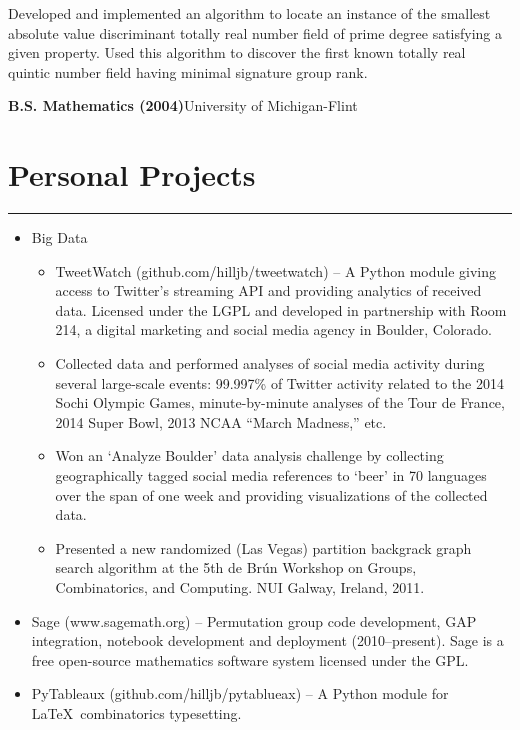 \documentclass[letterpaper,10pt]{article}
\newcommand{\mblue}{\color{darkblue}}
\begin{document}
Developed and implemented an algorithm to locate an instance of the smallest absolute value
discriminant totally real number field of prime degree satisfying a given property. Used this
algorithm to discover the first known totally real quintic number field having minimal signature
group rank.

\bigbreak \textbf{B.S. Mathematics (2004)}\hfill University of Michigan-Flint


\section*{\mblue Personal Projects}

\vspace{-2.15pc}
{\hfill\mblue\rule{5.21in}{0.02cm}}

\vspace{1pc}
\begin{itemize}
\item Big Data

\begin{itemize}
\item TweetWatch (github.com/hilljb/tweetwatch) -- A Python module giving access to Twitter's
streaming API and providing analytics of received data. Licensed under the LGPL and developed in
partnership with Room 214, a digital marketing and social media agency in Boulder, Colorado.

\item Collected data and performed analyses of social media activity during several large-scale
events: 99.997\% of Twitter activity related to the 2014 Sochi Olympic Games, minute-by-minute
analyses of the Tour de France, 2014 Super Bowl, 2013 NCAA ``March Madness,'' etc.

\item Won an `Analyze Boulder' data analysis challenge by collecting geographically tagged
social media references to `beer' in 70 languages over the span of one week and providing
visualizations of the collected data.

\item Presented a new randomized (Las Vegas) partition backgrack graph search algorithm at the 5th de
Br\'un Workshop on Groups, Combinatorics, and Computing. NUI Galway, Ireland, 2011. 
\end{itemize}

\item Sage (www.sagemath.org) -- Permutation group code development, GAP integration, notebook
development and deployment (2010--present). Sage is a free open-source mathematics software system
licensed under the GPL.

\item PyTableaux (github.com/hilljb/pytablueax) -- A Python module for \LaTeX\ combinatorics
typesetting. 
\end{itemize}
\end{document}
